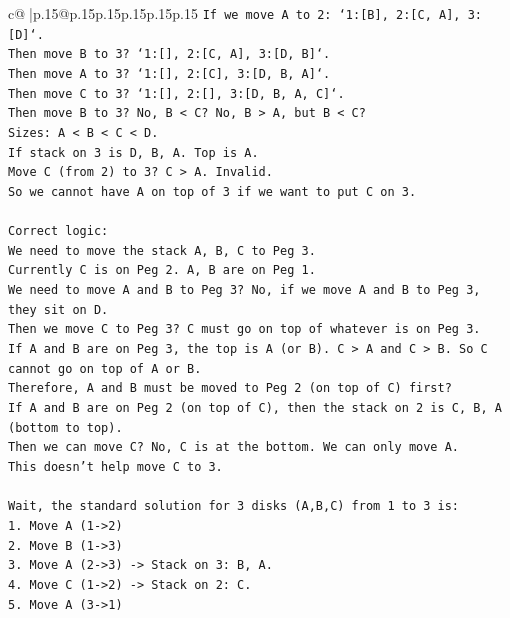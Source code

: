\documentclass{article}
\begin{document}
{\begin{supertabular}{c@{$\;$}|p{.15\linewidth}@{}p{.15\linewidth}p{.15\linewidth}p{.15\linewidth}p{.15\linewidth}p{.15\linewidth}}
{{{\texttt{If we move A to 2: `1:{[}B{]}, 2:{[}C, A{]}, 3:{[}D{]}`.} \\
\texttt{Then move B to 3? `1:{[}{]}, 2:{[}C, A{]}, 3:{[}D, B{]}`.} \\
\texttt{Then move A to 3? `1:{[}{]}, 2:{[}C{]}, 3:{[}D, B, A{]}`.} \\
\texttt{Then move C to 3? `1:{[}{]}, 2:{[}{]}, 3:{[}D, B, A, C{]}`.} \\
\texttt{Then move B to 3? No, B < C? No, B > A, but B < C?} \\
\texttt{Sizes: A < B < C < D.} \\
\texttt{If stack on 3 is D, B, A. Top is A.} \\
\texttt{Move C (from 2) to 3? C > A. Invalid.} \\
\texttt{So we cannot have A on top of 3 if we want to put C on 3.} \\
\\ 
\texttt{Correct logic:} \\
\texttt{We need to move the stack A, B, C to Peg 3.} \\
\texttt{Currently C is on Peg 2. A, B are on Peg 1.} \\
\texttt{We need to move A and B to Peg 3? No, if we move A and B to Peg 3, they sit on D.} \\
\texttt{Then we move C to Peg 3? C must go on top of whatever is on Peg 3.} \\
\texttt{If A and B are on Peg 3, the top is A (or B). C > A and C > B. So C cannot go on top of A or B.} \\
\texttt{Therefore, A and B must be moved to Peg 2 (on top of C) first?} \\
\texttt{If A and B are on Peg 2 (on top of C), then the stack on 2 is C, B, A (bottom to top).} \\
\texttt{Then we can move C? No, C is at the bottom. We can only move A.} \\
\texttt{This doesn't help move C to 3.} \\
\\ 
\texttt{Wait, the standard solution for 3 disks (A,B,C) from 1 to 3 is:} \\
\texttt{1. Move A (1{-}>2)} \\
\texttt{2. Move B (1{-}>3)} \\
\texttt{3. Move A (2{-}>3) {-}> Stack on 3: B, A.} \\
\texttt{4. Move C (1{-}>2) {-}> Stack on 2: C.} \\
\texttt{5. Move A (3{-}>1)} \\
}}}
\end{supertabular}}
\end{document}
